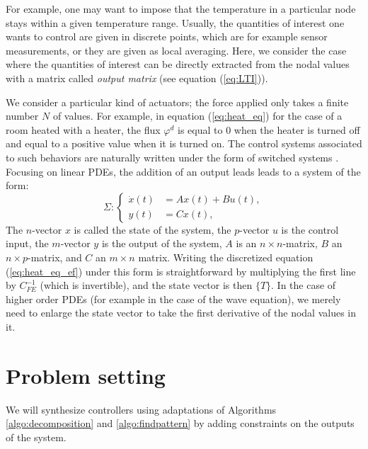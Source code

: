 For example, one may want to impose that the temperature in a particular node 
stays within a given temperature range. Usually, the quantities of interest one wants to 
control are given in discrete points, which are for example sensor 
measurements, or they are given as local averaging. Here, we consider
the case where the quantities of interest can be directly extracted from
the nodal values with a matrix called {\em output matrix} (see equation (\ref{eq:LTI})).

We consider a particular kind of actuators; the force applied only takes a finite number $N$ of values.
For example, in equation (\ref{eq:heat_eq}) for the case of a room heated with a heater, 
the flux $\varphi^d$ is equal to $0$ when the heater is turned off and 
equal to a positive value when it is turned on. The control systems associated to 
such behaviors are naturally written under the form of {switched systems}   \label{eq:switched_system0}.
Focusing on linear PDEs, the addition of an output leads leads to a system of the form:
\begin{equation}
 \Sigma : \left\lbrace
\begin{array}{ll}
\dot x(t) & = A x(t)+B u(t), \\
 y(t) & =C x(t),
\end{array}
\right.
\label{eq:LTI}
\end{equation}
The $n$-vector $x$ is called the state of the system, the $p$-vector $u$ is the control
input, the $m$-vector $y$ is the output of the system,
$A$ is an $n\times n$-matrix, $B$ an $n\times p$-matrix, and
$C$ an $m\times n$ matrix. 
Writing the discretized equation (\ref{eq:heat_eq_ef}) under this form is straightforward 
by multiplying the first line by $C_{FE}^{-1}$ (which is invertible), and the state 
vector is then $\{T\}$. In the case of higher 
order PDEs (for example in the case of the wave equation), we merely need to enlarge the state vector
to take the first derivative of the nodal values in it.



\section{Problem setting}
\label{sec:control}


We will synthesize controllers using adaptations of
Algorithms \ref{algo:decomposition} and \ref{algo:findpattern}
by adding constraints on the outputs of the system. 

